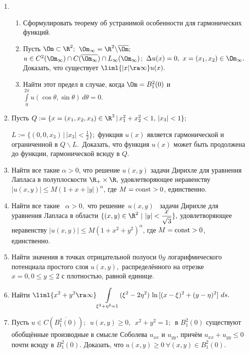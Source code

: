 \documentclass[a4paper]{article}
\def\a{\alpha}
\def\D{\Delta}
\begin{document}
\begin{enumerate}
\item
\begin{enumerate}
  \item
  Сформулировать теорему об устранимой особенности для гармонических функций.
  \item
  Пусть $\Om\subset\R^2;$\ $\Om_\infty=\R^2\backslash\overline\Om;$\
  $u\in C^2(\Om_\infty)\cap C(\overline{\Om_\infty})\cap
  L_\infty(\Om_\infty)$;\ $\D u(x)=0,\ x=(x_1,x_2)\in\Om_\infty.$
  Доказать, что существует $\liml{|x|\ra\infty} u(x).$
  \item
  Найти этот предел в случае, когда $\Om=B_1^2(0)$ и $\displaystyle
  {\int\limits_{0}^{2\pi} u(\cos \theta, \sin\theta)\, d\theta}=0.$
\end{enumerate}

\item
Пусть $Q:=\{x=(x_1,x_2,x_3)\in\R^3\, |\, x_1^2+x_2^2<1,\, |x_3|<1\};$

\noindent
$L:=\{(0,0,x_3)\, |\, |x_3|<\displaystyle{\frac{1}{2}}\}$;\
функция $u(x)$ является гармонической и ограниченной в $Q\backslash L.$\
Доказать, что функция $u(x)$
может быть продолжена до функции, гармонической всюду в $Q.$

\item
Найти все такие $\a>0$, что решение $u(x,y)$ задачи Дирихле для уравнения
Лапласа в полуплоскости $\R_+\times\R,$ удовлетворяющее
неравенству $|u(x, y)| \le M(1 + x + |y|)^\a$, где $M = \hbox {const} > 0$,
единственно.

\item
Найти все такие \ $\a>0$,\  что решение\  $u(x,y)$ \ задачи Дирихле для
уравнения Лапласа в области \quad $\{(x,y)\in\R^2\ |\ |y|<\displaystyle
{\frac{x}{\sqrt 3}}\},$ \quad удовлетворяющее неравенству \quad
$|u(x, y)| \le M (1 + x^2 + y^2)^\a$, где $M = \hbox {const} > 0$,
единственно.

\item
Найти значения в точках отрицательной полуоси $0y$ логарифмического
потенциала простого слоя $u(x,y),$ распределённого на отрезке
$x=0, 0\le y\le 2$ с плотностью, равной единице.

\item
Найти $\displaystyle{\liml{x^2+y^2\ra\infty}\int
\limits_{\xi^2+\eta^2=1}(\xi^2-2\eta^2)\ \hbox{ln}\,
[(x-\xi)^2+(y-\eta)^2]\ ds.}$

\item
Пусть $u\in C\left(\overline{B_1^2(0)}\right);$\ $u(x,y)\ge0,$\
$x^2+y^2=1;$\ в $B_1^2(0)$ существуют обобщённые производные в смысле
Соболева $u_{xx}$ и $u_{yy}$, причём $u_{xx}+u_{yy}\le 0$ почти всюду
в $B_1^2(0).$ Доказать, что $u(x,y)\ge 0 \ \forall (x,y)\in B_1^2(0).$


\end{enumerate}
\end{document}
